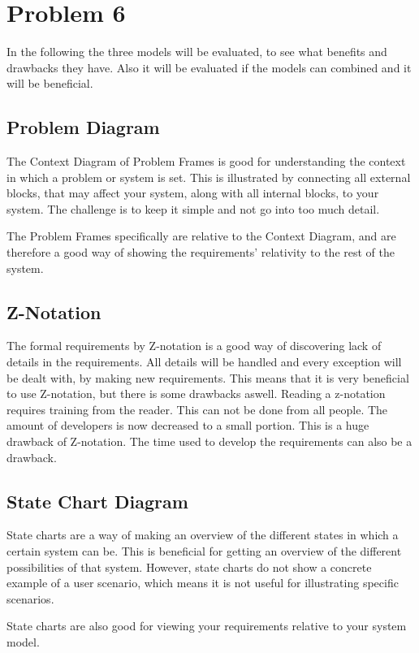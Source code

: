 \chapter{Problem 6}

In the following the three models will be evaluated, to see what benefits and drawbacks they have. Also it will be evaluated if the models can combined and it will be beneficial.

\section{Problem Diagram}
The Context Diagram of Problem Frames is good for understanding the context in which a problem or system is set. This is illustrated by connecting all external blocks, that may affect your system, along with all internal blocks, to your system. The challenge is to keep it simple and not go into too much detail.

The Problem Frames specifically are relative to the Context Diagram, and are therefore a good way of showing the requirements’ relativity to the rest of the system.


\section{Z-Notation}
The formal requirements by Z-notation is a good way of discovering lack of details in the requirements. All details will be handled and every exception will be dealt with, by making new requirements. This means that it is very beneficial to use Z-notation, but there is some drawbacks aswell. Reading a z-notation requires training from the reader. This can not be done from all people. The amount of developers is now decreased to a small portion. This is a huge drawback of Z-notation. The time used to develop the requirements can also be a drawback.





\section{State Chart Diagram}
State charts are a way of making an overview of the different states in which a certain system can be. This is beneficial for getting an overview of the different possibilities of that system. However, state charts do not show a concrete example of a user scenario, which means it is not useful for illustrating specific scenarios.

State charts are also good for viewing your requirements relative to your system model.